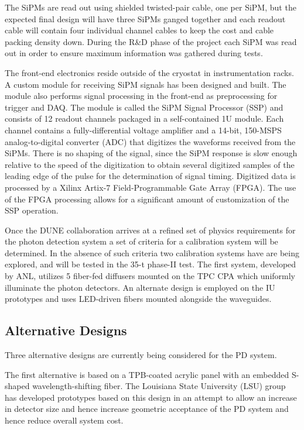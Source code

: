 The SiPMs are read out using shielded twisted-pair cable, one per SiPM,
but the expected final design will have three SiPMs ganged together and
each readout cable will contain four individual channel cables to keep
the cost and cable packing density down. During the R\&D phase of the
project each SiPM was read out in order to ensure maximum information
was gathered during tests.  

The front-end electronics reside outside of the cryostat in
instrumentation racks. A custom module for receiving SiPM signals has
been designed and built. The module also performs signal processing in
the front-end as preprocessing for trigger and DAQ.  The module is
called the SiPM Signal Processor (SSP) and consists of 12 readout
channels packaged in a self-contained 1U module.  Each channel
contains a fully-differential voltage amplifier and a 14-bit, 150-MSPS
analog-to-digital converter (ADC) that digitizes the waveforms
received from the SiPMs. There is no shaping of the signal, since the
SiPM response is slow enough relative to the speed of the digitization
to obtain several digitized samples of the leading edge of the pulse
for the determination of signal timing. Digitized data is processed by
a Xilinx Artix-7 Field-Programmable Gate Array (FPGA).  The use of the
FPGA processing allows for a significant amount of customization of
the SSP operation. 

Once the DUNE collaboration arrives at a refined set of physics
requirements for the photon detection system a set of criteria for a
calibration system will be determined. In the absence of such criteria
two calibration systems have are being explored, and will be tested in
the 35-t phase-II test. The first system, developed by ANL, utilizes 5
fiber-fed diffusers mounted on the TPC CPA which uniformly illuminate
the photon detectors. An alternate design is employed on the IU
prototypes and uses LED-driven fibers mounted alongside the
waveguides. 

\subsection{Alternative Designs} 

Three alternative designs are currently being considered for the PD
system.

The first alternative is based on a TPB-coated acrylic panel with an
embedded S-shaped wavelength-shifting fiber. The Louisiana State
University (LSU) group has developed prototypes based on this design
in an attempt to allow an increase in detector size and hence increase
geometric acceptance of the PD system and hence reduce overall system
cost.

